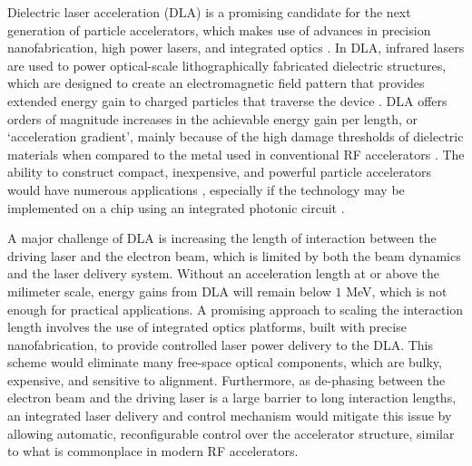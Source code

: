 \documentclass[%
 reprint,
 amsmath,amssymb,
 aps,
prstab,
floatfix,
]{revtex4-1}
\begin{document}
Dielectric laser acceleration (DLA) is a promising candidate for the next generation of particle accelerators, which makes use of advances in precision nanofabrication, high power lasers, and integrated optics \cite{peralta_demonstration_2013,breuer_laser-based_2013,breuer_dielectric_2014,leedle_dielectric_2015,leedle_laser_2015,wootton_demonstration_2016}.  In DLA, infrared lasers are used to power optical-scale lithographically fabricated dielectric structures, which are designed to create an electromagnetic field pattern that provides extended energy gain to charged particles that traverse the device \cite{plettner_proposed_2006, hughes_method_2017}.  DLA offers orders of magnitude increases in the achievable energy gain per length, or `acceleration gradient', mainly because of the high damage thresholds of dielectric materials when compared to the metal used in conventional RF accelerators \cite{soong_laser_2013}.  The ability to construct compact, inexpensive, and powerful particle accelerators would have numerous applications \cite{england_dielectric_2014,wootton_dielectric_2016,wootton_towards_2017}, especially if the technology may be implemented on a chip using an integrated photonic circuit \cite{hughes_-chip_2017}.

A major challenge of DLA is increasing the length of interaction between the driving laser and the electron beam, which is limited by both the beam dynamics and the laser delivery system.  Without an acceleration length at or above the milimeter scale, energy gains from DLA will remain below $1$ MeV, which is not enough for practical applications.  A promising approach to scaling the interaction length involves the use of integrated optics platforms, built with precise nanofabrication, to provide controlled laser power delivery to the DLA.  This scheme would eliminate many free-space optical components, which are bulky, expensive, and sensitive to alignment.  Furthermore, as de-phasing between the electron beam and the driving laser is a large barrier to long interaction lengths, an integrated laser delivery and control mechanism would mitigate this issue by allowing automatic, reconfigurable control over the accelerator structure, similar to what is commonplace in modern RF accelerators.
\end{document}
